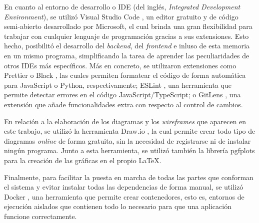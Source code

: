\bigskip
En cuanto al entorno de desarrollo o IDE (del inglés, \textit{Integrated Development Environment}), se utilizó Visual Studio Code \cite{vscode}, un editor gratuito y de código semi-abierto desarrollado por Microsoft, el cual
brinda una gran flexibilidad para trabajar con cualquier lenguaje de programación gracias a sus extensiones. Esto hecho, posibilitó el desarrollo
del \textit{backend}, del \textit{frontend} e inluso de esta memoria en un mismo programa, simplificando la tarea de aprender las peculiaridades de
otros IDEs más específicos. Más en concreto, se utilizaron extensiones como Prettier \cite{prettier} o Black \cite{blackformatter}, las cuales permiten formatear el código de forma automática para JavaScript o Python, respectivamente;
ESLint \cite{eslint}, una herramienta que permite detectar errores en el código JavaScript/TypeScript; o GitLens \cite{gitlens}, una extensión que añade funcionalidades extra con respecto
al control de cambios.

\bigskip
En relación a la elaboración de los diagramas y los \textit{wireframes} que aparecen en este trabajo, se utilizó la herramienta Draw.io \cite{drawio}, la cual permite crear todo tipo de diagramas
\textit{online} de forma gratuita, sin la necesidad de registrarse ni de instalar ningún programa.
Junto a esta herramienta, se utilizó también la librería pgfplots \cite{pgfplots} para la creación de las gráficas en el propio \LaTeX.

\bigskip
Finalmente, para facilitar la puesta en marcha de todas las partes que conforman el sistema y evitar instalar todas las dependencias de forma manual, se utilizó Docker \cite{docker},
una herramienta que permite crear contenedores, esto es, entornos de ejecución aislados que contienen todo lo necesario para que una aplicación funcione correctamente.
